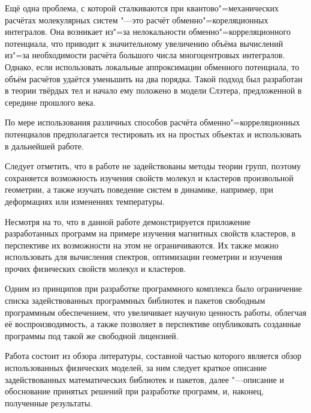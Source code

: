 Ещё одна проблема, с которой сталкиваются при квантово"=механических расчётах
молекулярных систем "---это расчёт обменно"=кореляционных интегралов. Она
возникает из"=за нелокальности обменно"=корреляционного потенциала, что приводит
к значительному увеличению объёма вычислений из"=за необходимости расчёта
большого числа многоцентровых интегралов. Однако, если использовать локальные
аппроксимации обменного потенциала, то объём расчётов удаётся уменьшить на два
порядка. Такой подход был разработан в теории твёрдых тел и начало ему положено
в модели Слэтера, предложенной в середине прошлого века.

По мере использования различных способов расчёта обменно"=корреляционных
потенциалов предполагается тестировать их на простых объектах и использовать в
дальнейшей работе.

Следует отметить, что в работе не задействованы методы теории групп, поэтому сохраняется возможность изучения свойств
молекул и кластеров произвольной геометрии, а также изучать поведение систем в динамике, например, при деформациях
или изменениях температуры.

Несмотря на то, что в данной работе демонстрируется приложение разработанных программ на примере изучения магнитных
свойств кластеров, в перспективе их возможности на этом не ограничиваются. Их также можно использовать для вычисления
спектров, оптимизации геометрии и изучения прочих физических свойств молекул и кластеров.

Одним из принципов при разработке программного комплекса было ограничение списка задействованных программных
библиотек и пакетов свободным программным обеспечением, что увеличивает научную ценность работы, облегчая её
воспроизводимость, а также позволяет в перспективе опубликовать созданные программы под такой же свободной лицензией.

Работа состоит из обзора литературы, составной частью которого является обзор использованных физических моделей,
за ним следует краткое описание задействованных математических библиотек и пакетов, далее "---описание и обоснование
принятых решений при разработке программ, и, наконец, полученные результаты.
